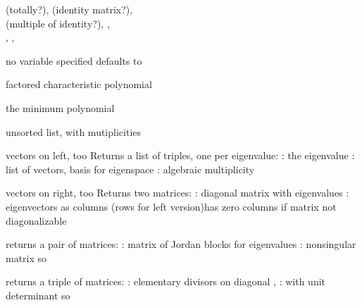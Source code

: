 \documentclass[a4paper]{article}
\begin{document}
\begin{multicols*}{3}

 (totally?), 
 (identity matrix?),\\
 (multiple of identity?), 
,\\
, 
, 


no variable specified defaults to  \BreakLineAndIndent
{}

factored characteristic polynomial

the minimum polynomial  \BreakLineAndIndent
{}

unsorted list, with mutiplicities

vectors on left,  too \BreakLineAndIndent
Returns a list of triples, one per eigenvalue: \BreakLineAndDoubleIndent
{}: the eigenvalue          \BreakLineAndDoubleIndent
{}: list of vectors, basis for eigenspace \BreakLineAndDoubleIndent
{}: algebraic multiplicity  

vectors on right,  too \BreakLineAndIndent
Returns two matrices: \BreakLineAndDoubleIndent
{}: diagonal matrix with eigenvalues \BreakLineAndDoubleIndent
{}: eigenvectors as columns (rows for left version)\BreakLineAndIndent[\skipin\skipin\phantom{P:}]
 has zero columns if matrix not diagonalizable
                    
%


  \BreakLineAndIndent
returns a pair of matrices:      \BreakLineAndDoubleIndent
{}: matrix of Jordan blocks for eigenvalues \BreakLineAndDoubleIndent
{}: nonsingular matrix \BreakLineAndDoubleIndent
 so  

%
 returns a triple of matrices:       \BreakLineAndIndent
{}: elementary divisors on diagonal        \BreakLineAndIndent
{}, : with unit determinant \BreakLineAndIndent
so 


\end{multicols*}
\end{document}

